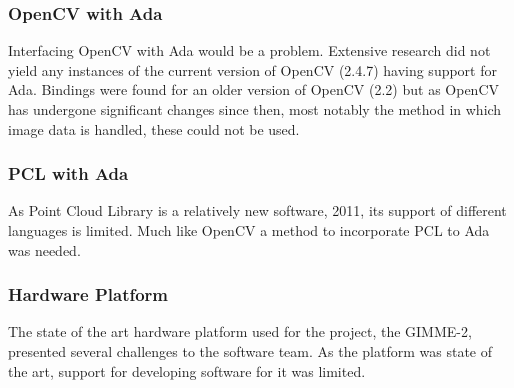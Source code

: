 \subsubsection{OpenCV with Ada}
Interfacing OpenCV with Ada would be a problem. Extensive research did not yield any instances of the current version of OpenCV (2.4.7) having support for Ada. Bindings were found for an older version of OpenCV (2.2) \cite{web:oldAdaBindings} but as OpenCV has undergone significant changes since then, most notably the method in which image data is handled, these could not be used.

\subsubsection{PCL with Ada}
As Point Cloud Library is a relatively new software, 2011, \cite{Rusu_ICRA2011_PCL} its support of different languages is limited. Much like OpenCV a method to incorporate PCL to Ada was needed.

\subsubsection{Hardware Platform}
The state of the art hardware platform used for the project, the GIMME-2, presented several challenges to the software team. As the platform was state of the art, support for developing software for it was limited.

